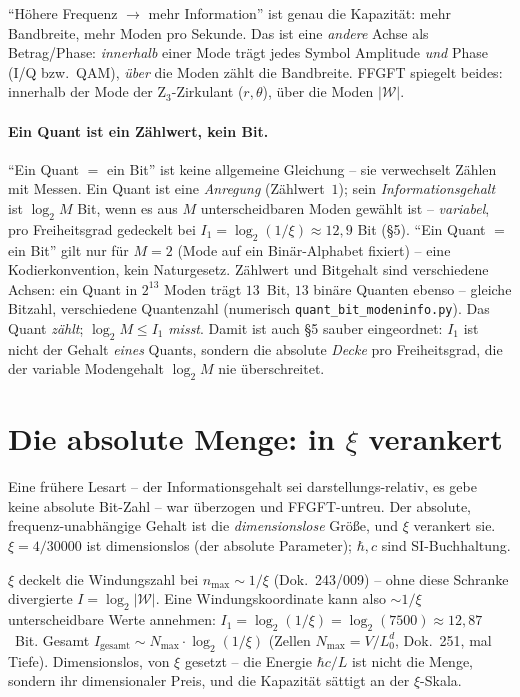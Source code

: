 \enquote{Höhere Frequenz $\to$ mehr Information} ist genau die Kapazität: mehr Bandbreite, mehr Moden pro
Sekunde. Das ist eine \emph{andere} Achse als Betrag/Phase: \emph{innerhalb} einer Mode trägt jedes
Symbol Amplitude \emph{und} Phase (I/Q bzw.\ QAM), \emph{über} die Moden zählt die Bandbreite. FFGFT
spiegelt beides: innerhalb der Mode der Z$_3$-Zirkulant ($r,\theta$), über die Moden $|\mathcal{W}|$.

\paragraph{Ein Quant ist ein Zählwert, kein Bit.} \enquote{Ein Quant $=$ ein Bit} ist keine allgemeine
Gleichung -- sie verwechselt Zählen mit Messen. Ein Quant ist eine \emph{Anregung} (Zählwert~$1$); sein
\emph{Informationsgehalt} ist $\log_2 M$ Bit, wenn es aus $M$ unterscheidbaren Moden gewählt ist --
\emph{variabel}, pro Freiheitsgrad gedeckelt bei $I_1=\log_2(1/\xi)\approx12{,}9$ Bit (§5). \enquote{Ein
Quant $=$ ein Bit} gilt nur für $M=2$ (Mode auf ein Binär-Alphabet fixiert) -- eine Kodierkonvention, kein
Naturgesetz. Zählwert und Bitgehalt sind verschiedene Achsen: ein Quant in $2^{13}$ Moden trägt $13$~Bit,
$13$ binäre Quanten ebenso -- gleiche Bitzahl, verschiedene Quantenzahl (numerisch
\texttt{quant\_bit\_modeninfo.py}). Das Quant \emph{zählt}; $\log_2 M\le I_1$ \emph{misst}. Damit ist auch
§5 sauber eingeordnet: $I_1$ ist nicht der Gehalt \emph{eines} Quants, sondern die absolute \emph{Decke}
pro Freiheitsgrad, die der variable Modengehalt $\log_2 M$ nie überschreitet.

\section{Die absolute Menge: in $\xi$ verankert}
Eine frühere Lesart -- der Informationsgehalt sei darstellungs-relativ, es gebe keine absolute Bit-Zahl
-- war überzogen und FFGFT-untreu. Der absolute, frequenz-unabhängige Gehalt ist die \emph{dimensionslose}
Größe, und $\xi$ verankert sie. $\xi=4/30000$ ist dimensionslos (der absolute Parameter); $\hbar,c$ sind
SI-Buchhaltung.

$\xi$ deckelt die Windungszahl bei $n_\text{max}\sim1/\xi$ (Dok.~243/009) -- ohne diese Schranke
divergierte $I=\log_2|\mathcal{W}|$. Eine Windungskoordinate kann also $\sim1/\xi$ unterscheidbare Werte
annehmen: $I_1=\log_2(1/\xi)=\log_2(7500)\approx12{,}87$~Bit. Gesamt
$I_\text{gesamt}\sim N_\text{max}\cdot\log_2(1/\xi)$ (Zellen $N_\text{max}=V/L_0^{d}$, Dok.~251, mal
Tiefe). Dimensionslos, von $\xi$ gesetzt -- die Energie $\hbar c/L$ ist nicht die Menge, sondern ihr
dimensionaler Preis, und die Kapazität sättigt an der $\xi$-Skala.


